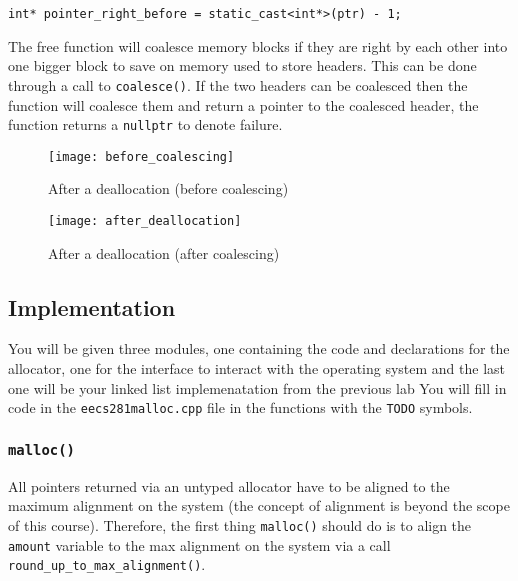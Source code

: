 \documentclass{article}
\begin{document}
\begin{lstlisting}
int* pointer_right_before = static_cast<int*>(ptr) - 1;
\end{lstlisting}

The free function will coalesce memory blocks if they are right by each other
into one bigger block to save on memory used to store headers.  This can be
done through a call to \texttt{coalesce()}.  If the two headers can be
coalesced then the function will coalesce them and return a pointer to the
coalesced header, the function returns a \texttt{nullptr} to denote failure.

\begin{figure}[!htb]
\centering
\texttt{[image: before\_coalescing]}
\caption{After a deallocation (before coalescing)}
\end{figure}

\begin{figure}[!htb]
\centering
\texttt{[image: after\_deallocation]}
\caption{After a deallocation (after coalescing)}
\end{figure}

\newpage
\subsection{Implementation}
You will be given three modules, one containing the code and declarations for
the allocator, one for the interface to interact with the operating system and
the last one will be your linked list implemenatation from the previous lab
You will fill in code in the \texttt{eecs281malloc.cpp} file in the functions
with the \texttt{TODO} symbols.

\subsubsection{\texttt{malloc()}}
All pointers returned via an untyped allocator have to be aligned to the
maximum alignment on the system (the concept of alignment is beyond the scope
of this course).  Therefore, the first thing \texttt{malloc()} should do is to
align the \texttt{amount} variable to the max alignment on the system via a
call \texttt{round\_up\_to\_max\_alignment()}.
\end{document}

